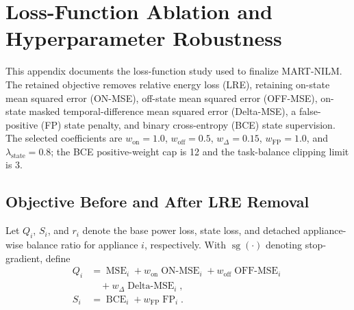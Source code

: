 \documentclass[conference]{IEEEtran}
\begin{document}
\section{Loss-Function Ablation and Hyperparameter Robustness}
\label{sec:appendix-loss}

This appendix documents the loss-function study used to finalize MART-NILM. The retained objective removes relative energy loss (LRE), retaining on-state mean squared error (ON-MSE), off-state mean squared error (OFF-MSE), on-state masked temporal-difference mean squared error (Delta-MSE), a false-positive (FP) state penalty, and binary cross-entropy (BCE) state supervision. The selected coefficients are $w_{\mathrm{on}}=1.0$, $w_{\mathrm{off}}=0.5$, $w_{\Delta}=0.15$, $w_{\mathrm{FP}}=1.0$, and $\lambda_{\mathrm{state}}=0.8$; the BCE positive-weight cap is 12 and the task-balance clipping limit is 3.

\subsection{Objective Before and After LRE Removal}
\label{sec:appendix-loss-equations}

Let $Q_i$, $S_i$, and $r_i$ denote the base power loss, state loss, and detached appliance-wise balance ratio for appliance $i$, respectively.  With $\operatorname{sg}(\cdot)$ denoting stop-gradient, define
\begin{equation}
\begin{aligned}
Q_i &= \operatorname{MSE}_{i}+w_{\mathrm{on}}\operatorname{ON\text{-}MSE}_{i}
      +w_{\mathrm{off}}\operatorname{OFF\text{-}MSE}_{i}\\
&\quad +w_{\Delta}\operatorname{Delta\text{-}MSE}_{i},\\
S_i &= \operatorname{BCE}_{i}+w_{\mathrm{FP}}\operatorname{FP}_{i}.
\label{eq:appendix-power-state-components}
\end{aligned}
\end{equation}
\end{document}
